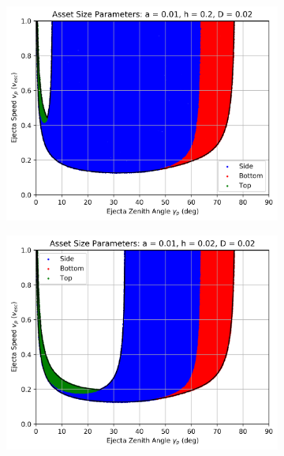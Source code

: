 \documentclass{article}
\begin{document}
\begin{figure}
	\begin{subfigure}[t]{.32\textwidth}
		\centering
		\includegraphics[width=.98\linewidth]{asset_speed_zenith_plot_1.010e+00_1.000e-02_2.000e-01_2.000e-02.png}  
		\label{fig:sub-asset_speed_zenith_h1_4}
	\end{subfigure}
	\begin{subfigure}[t]{.32\textwidth}
		\centering
		\includegraphics[width=.98\linewidth]{asset_speed_zenith_plot_1.010e+00_1.000e-02_2.000e-02_2.000e-02.png}  
		\label{fig:sub-asset_speed_zenith_h1_5}
	\end{subfigure}

\end{figure}
\end{document}
